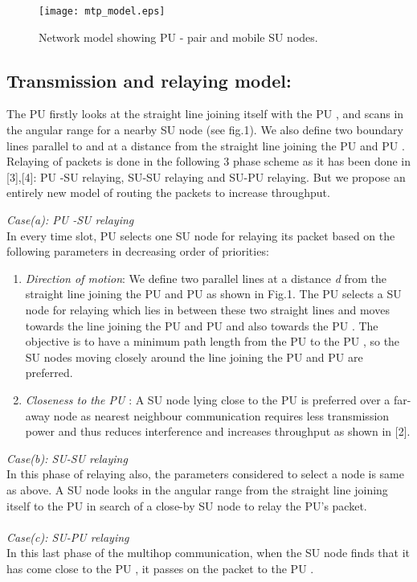 \documentclass[conference]{IEEEtran}
\begin{document}
\begin{figure}[ht] \centering \label{con} \texttt{[image: mtp\_model.eps]}\\
\caption{Network model showing PU - pair and mobile SU nodes.} 
\vspace{-2.25mm}
\end{figure}

\subsection{Transmission and relaying model:} The PU  firstly looks at the straight line joining itself with the PU , and scans in the angular range  for a nearby SU node (see fig.1). 
We also define two boundary lines parallel to and at a distance  from the straight line joining the PU  and PU . Relaying of packets is done in the following 
3 phase scheme as it has been done in [3],[4]: PU -SU relaying, SU-SU relaying and SU-PU  relaying. But we propose an entirely new model of routing the packets to increase
throughput.

\emph{Case(a): PU -SU relaying}\\
In every time slot, PU  selects one SU node for relaying its packet based on the following parameters in decreasing order of priorities:
\begin{enumerate}
 \item \textit{Direction of motion}: We define two parallel lines at a distance \emph{d} from the straight line joining the PU  and PU  as shown in Fig.1. The PU  
selects a SU node for relaying which lies in between these two 
straight lines and moves towards the line joining the PU  and PU  and also towards the PU . The objective is to have a minimum path length from the PU  
to the PU , so the SU nodes moving closely around the line joining the PU  and PU  are preferred.

\item \textit{Closeness to the PU }: A SU node lying close to the PU  is preferred over a far-away node as nearest neighbour communication requires less transmission power and thus
reduces interference and increases throughput as shown in [2].

\end{enumerate}

\emph{Case(b): SU-SU relaying}\\ In this phase of relaying also, the parameters considered to select a node is same as above. A SU node looks in the angular range  
from the straight line joining itself to the PU  in search of a close-by SU node to relay the PU's packet.\\ \\
\emph{Case(c): SU-PU  relaying}\\ In this last phase of the multihop communication, when the SU node finds that it has come close to the PU , it passes on the packet to the PU .
\end{document}
